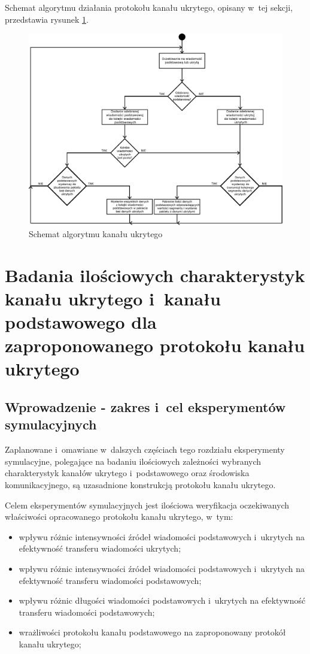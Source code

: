 \documentclass[a4paper, twoside, 12pt]{report}
\begin{document}
    Schemat algorytmu działania protokołu kanału ukrytego, opisany w~tej sekcji,
    przedstawia rysunek \ref{CHANNELALGORITHM}.

        \begin{figure}[h]
                \centering
                \includegraphics[scale=0.60, angle=90]{algorytm_kanalu_ukrytego}
                \caption{Schemat algorytmu kanału ukrytego}
                \label{CHANNELALGORITHM}
        \end{figure}

\chapter{Badania ilościowych charakterystyk kanału ukrytego i~kanału podstawowego dla zaproponowanego protokołu kanału ukrytego}
    \section{Wprowadzenie - zakres i~cel eksperymentów symulacyjnych}
    Zaplanowane i~omawiane w~dalszych częściach tego rozdziału eksperymenty symulacyjne,
    polegające na badaniu ilościowych zależności wybranych charakterystyk kanałów
    ukrytego i~podstawowego oraz środowiska komunikacyjnego, są uzasadnione konstrukcją
    protokołu kanału ukrytego.

    Celem eksperymentów symulacyjnych jest ilościowa weryfikacja oczekiwanych właściwości
    opracowanego protokołu kanału ukrytego, w~tym:
    \begin{itemize} \itemsep1pt \parskip0pt 
        \item wpływu różnic intensywności źródeł wiadomości podstawowych i~ukrytych na
            efektywność transferu wiadomości ukrytych;
        \item wpływu różnic intensywności źródeł wiadomości podstawowych i~ukrytych na
            efektywność transferu wiadomości podstawowych;
        \item wpływu różnic długości wiadomości podstawowych i~ukrytych na efektywność
            transferu wiadomości podstawowych;
        \item wrażliwości protokołu kanału podstawowego na zaproponowany protokół
            kanału ukrytego;
    \end{itemize}
\end{document}
